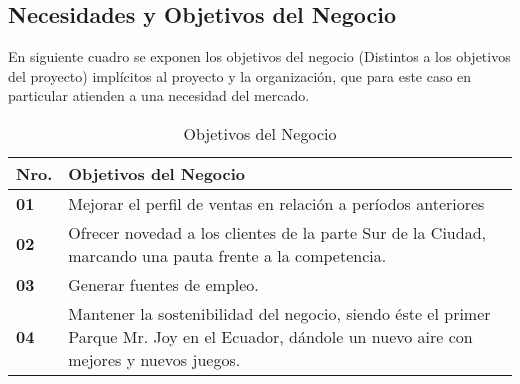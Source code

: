 \documentclass[11pt,a4paper,roman]{article}
\begin{document}
\subsection{Necesidades y Objetivos del Negocio}
En siguiente cuadro se exponen los objetivos del negocio (Distintos a los objetivos del proyecto) implícitos al proyecto y la organización, que para este caso en particular atienden a una necesidad del mercado.
\begin{table}[h]
\caption{Objetivos del Negocio}
\label{tab:objetivosneg}	

\begin{tabular}{|p{1cm}|p{14cm}|}
	\hline \textbf{Nro.}
	& \textbf{Objetivos del Negocio} \\ 
	\hline \textbf{01}
	& Mejorar el perfil de ventas en relación a períodos anteriores \\ 
	\hline \textbf{02}
	& Ofrecer novedad a los clientes de la parte Sur de la Ciudad, marcando una pauta frente a la competencia. \\ 
	\hline \textbf{03}
	& Generar fuentes de empleo. \\ 
	\hline \textbf{04}
	& Mantener la sostenibilidad del negocio, siendo éste el primer Parque Mr. Joy en el Ecuador, dándole un nuevo aire con mejores y nuevos juegos. \\ 
	\hline 
\end{tabular} 
\end{table}
\end{document}
